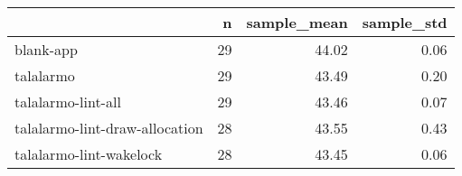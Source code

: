 \begin{tabular}{lrrr}
\toprule
{} &   n &  sample\_mean &  sample\_std \\
\midrule
blank-app                      &  29 &        44.02 &        0.06 \\
talalarmo                      &  29 &        43.49 &        0.20 \\
talalarmo-lint-all             &  29 &        43.46 &        0.07 \\
talalarmo-lint-draw-allocation &  28 &        43.55 &        0.43 \\
talalarmo-lint-wakelock        &  28 &        43.45 &        0.06 \\
\bottomrule
\end{tabular}
